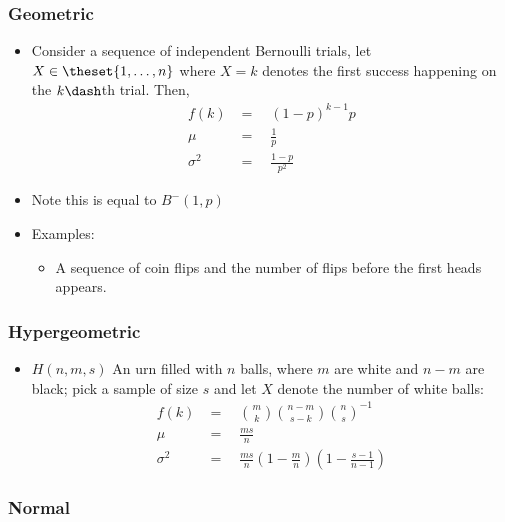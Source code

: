 \hypertarget{geometric}{%
\subsubsection{Geometric}\label{geometric}}

\begin{itemize}
\tightlist
\item
  Consider a sequence of independent Bernoulli trials, let
  \(X \in \theset{1,\ldots, n}\) where \(X=k\) denotes the first success
  happening on the \(k\dash\)th trial. Then,
  \begin{align*}
  f(k)            &= \quad (1-p)^{k-1} p \\
  \mu             &= \quad \frac 1 p \\
  \sigma^2    &= \quad \frac{1-p}{p^2}
  \end{align*}
\item
  Note this is equal to \(B^-(1, p)\)
\item
  Examples:

  \begin{itemize}
  \tightlist
  \item
    A sequence of coin flips and the number of flips before the first
    heads appears.
  \end{itemize}
\end{itemize}

\hypertarget{hypergeometric}{%
\subsubsection{Hypergeometric}\label{hypergeometric}}

\begin{itemize}
\tightlist
\item
  \(H(n, m, s)\) An urn filled with \(n\) balls, where \(m\) are white
  and \(n-m\) are black; pick a sample of size \(s\) and let \(X\)
  denote the number of white balls:
  \begin{align*}
  f(k)            &= \quad {m \choose k} {n-m \choose s-k} {n \choose s}^{-1} \\
  \mu             &= \quad \frac{ms}{n} \\
  \sigma^2    &= \quad \frac{ms}{n}(1- \frac{m}{n})\left( 1 - \frac{s-1}{n-1} \right)
  \end{align*}
\end{itemize}

\hypertarget{normal}{%
\subsubsection{Normal}\label{normal}}

